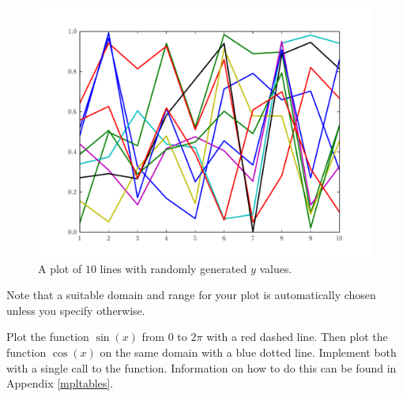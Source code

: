 \begin{figure}
\includegraphics[width=\textwidth]{statemachine.pdf}
\caption{A plot of $10$ lines with randomly generated $y$ values.}
\label{fig:statemachine}
\end{figure}

Note that a suitable domain and range for your plot is automatically chosen unless you specify otherwise.

\begin{problem} Plot the function $\sin(x)$ from $0$ to $2\pi$ with a red dashed line.
Then plot the function $\cos(x)$ on the same domain with a blue dotted line.
Implement both with a single call to the  function.
Information on how to do this can be found in Appendix \ref{mpltables}.
\end{problem}

